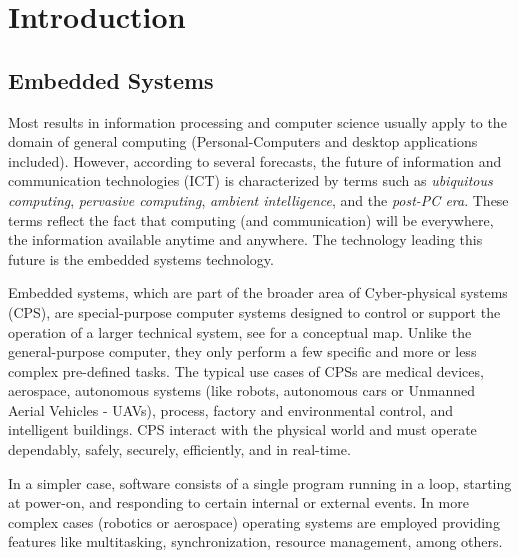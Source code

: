 
\chapter{Introduction}

\ifpdf
    \graphicspath{{Chapters/Figs/Raster/}{Chapters/Figs/PDF/}{Chapters/Figs/}}
\else
    \graphicspath{{Chapters/Figs/Vector/}{Chapters/Figs/}}
\fi


\section{Embedded Systems}
Most results in information processing and computer science usually apply to the domain of general computing (Personal-Computers and desktop applications included). However, according to several forecasts, the future of information and communication technologies (ICT) is characterized by terms such as \emph{ubiquitous computing}, \emph{pervasive computing}, \emph{ambient intelligence}, and the \emph{post-PC era}. These terms reflect the fact that computing (and communication) will be everywhere, the information available anytime and anywhere. The technology leading this future is the embedded systems technology.%
\par Embedded systems, which are part of the broader area of Cyber-physical systems (CPS), are special-purpose computer systems designed to control or support the operation of a larger technical system, see \cite{BerkleyCPS} for a conceptual map. Unlike the general-purpose computer, they only perform a few specific and more or less complex pre-defined tasks. The typical use cases of CPSs are medical devices, aerospace, autonomous systems (like robots, autonomous cars or Unmanned Aerial Vehicles - UAVs), process, factory and environmental control, and intelligent buildings. CPS interact with the physical world and must operate dependably, safely, securely, efficiently, and in real-time.
\par In a simpler case, software consists of a single program running in a loop, starting at power-on, and responding to certain internal or external events. In more complex cases (robotics or aerospace) operating systems are employed providing features like multitasking, synchronization, resource management, among others.

